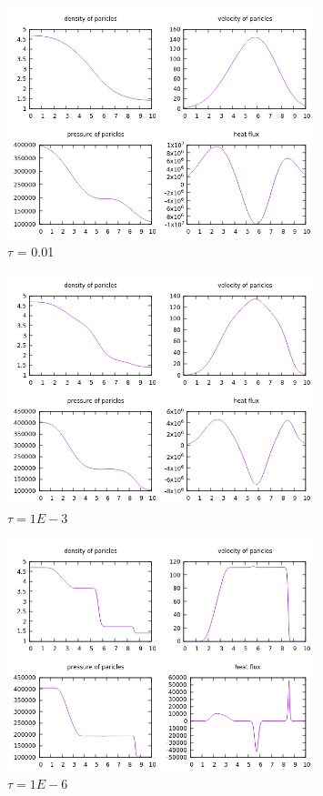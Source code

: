 \documentclass[paper=a4, fontsize=12pt]{scrartcl}
\begin{document}
\begin{figure}[H]
        \centering
        \includegraphics[width=0.8\textwidth]{tau0-01}
        \caption{$\tau$ = 0.01}
        \label{fig:tau0-01}
\end{figure}
\begin{figure}[H]
        \centering
        \includegraphics[width=0.8\textwidth]{tau_1e-3}
        \caption{$\tau = 1E-3$ }
        \label{fig:tau_1e-3}
\end{figure}
\begin{figure}[H]
        \centering
        \includegraphics[width=0.8\textwidth]{tau_1e-6}
        \caption{$\tau = 1E-6$ }
        \label{fig:tau_1e-6}
\end{figure}
\end{document}
